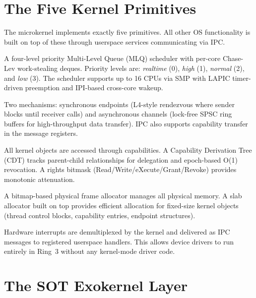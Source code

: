 \documentclass[11pt,a4paper,twoside]{report}
\theoremstyle{definition}
\begin{document}
\section{The Five Kernel Primitives}

The microkernel implements exactly five primitives. All other OS functionality
is built on top of these through userspace services communicating via IPC.

\begin{description}[leftmargin=1.4em]
  \item[Scheduling.] A four-level priority Multi-Level Queue (MLQ) scheduler
    with per-core Chase-Lev work-stealing deques. Priority levels are:
    \textit{realtime} (0), \textit{high} (1), \textit{normal} (2), and
    \textit{low} (3). The scheduler supports up to 16 CPUs via SMP with
    LAPIC timer-driven preemption and IPI-based cross-core wakeup.

  \item[IPC.] Two mechanisms: synchronous endpoints (L4-style rendezvous
    where sender blocks until receiver calls) and asynchronous channels
    (lock-free SPSC ring buffers for high-throughput data transfer). IPC
    also supports capability transfer in the message registers.

  \item[Capabilities.] All kernel objects are accessed through capabilities.
    A Capability Derivation Tree (CDT) tracks parent-child relationships
    for delegation and epoch-based O(1) revocation. A rights bitmask
    (Read/Write/eXecute/Grant/Revoke) provides monotonic attenuation.

  \item[Frame Allocation.] A bitmap-based physical frame allocator manages
    all physical memory. A slab allocator built on top provides efficient
    allocation for fixed-size kernel objects (thread control blocks,
    capability entries, endpoint structures).

  \item[IRQ Virtualization.] Hardware interrupts are demultiplexed by the
    kernel and delivered as IPC messages to registered userspace handlers.
    This allows device drivers to run entirely in Ring~3 without any
    kernel-mode driver code.
\end{description}

\section{The SOT Exokernel Layer}
\end{document}
